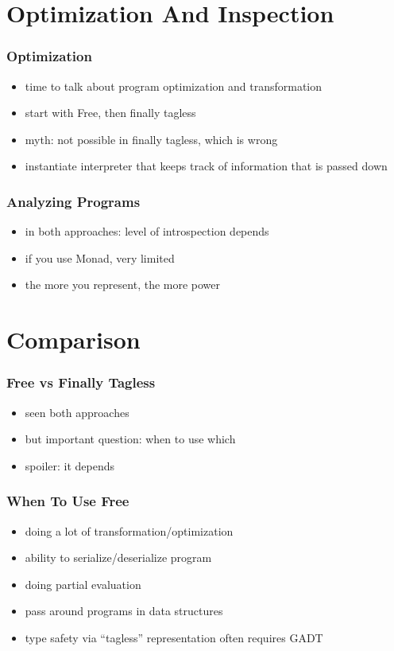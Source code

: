 \documentclass[aspectratio=169, hyperref={colorlinks, linkcolor=beamer@centricgreen}, urlcolor=links]{beamer}
\begin{document}
\section{Optimization And Inspection}\label{sec:optimization-and-inspection}

\begin{frame}
  \frametitle{Optimization}
  \begin{itemize}
  \item time to talk about program optimization and transformation
  \item start with Free, then finally tagless
  \item myth: not possible in finally tagless, which is wrong
  \item instantiate interpreter that keeps track of information that is passed down
  \end{itemize}
\end{frame}

\begin{frame}
  \frametitle{Analyzing Programs}
  \begin{itemize}
  \item in both approaches: level of introspection depends
  \item if you use Monad, very limited
  \item the more you represent, the more power
  \end{itemize}
\end{frame}

\section{Comparison}\label{sec:free-vs-tagless}

\begin{frame}
  \frametitle{Free vs Finally Tagless}
  \begin{itemize}
  \item seen both approaches
  \item but important question: when to use which
  \item spoiler: it depends
  \end{itemize}
\end{frame}

\begin{frame}
  \frametitle{When To Use Free}
  \begin{itemize}
  \item doing a lot of transformation/optimization
  \item ability to serialize/deserialize program
  \item doing partial evaluation
  \item pass around programs in data structures
  \item type safety via ``tagless'' representation often requires GADT
  \end{itemize}
\end{frame}
\end{document}
